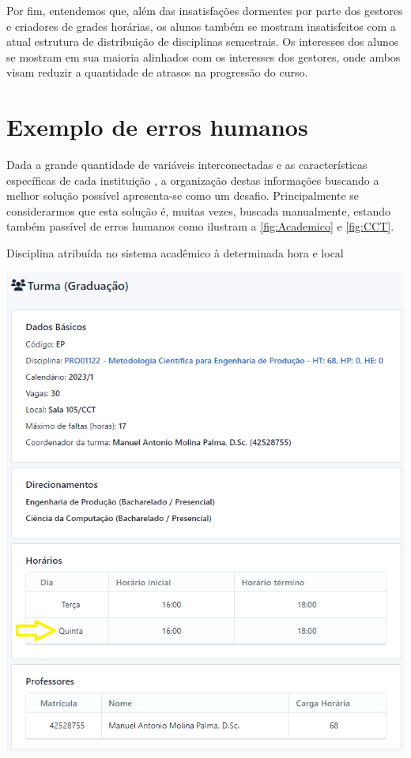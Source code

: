 Por fim, entendemos que, além das insatisfações dormentes por parte dos gestores e criadores de grades horárias, os alunos também se mostram insatisfeitos com a atual estrutura de distribuição de disciplinas semestrais. Os interesses dos alunos se mostram em sua maioria alinhados com os interesses dos gestores, onde ambos visam reduzir a quantidade de atrasos na progressão do curso.

\section{Exemplo de erros humanos} %

Dada a grande quantidade de variáveis interconectadas e as características específicas de cada instituição \cite{miranda_udpskeduler_2012}, a organização destas informações buscando a melhor solução possível apresenta-se como um desafio. Principalmente se considerarmos que esta solução é, muitas vezes, buscada manualmente, estando também passível de erros humanos como ilustram a \autoref{fig:Academico} e \autoref{fig:CCT}.

\begin{MyCenteredFigure}
  \caption{Disciplina atribuída no sistema acadêmico à determinada hora e local}
  \label{fig:Academico}
  \includegraphics[width=\textwidth]{files/img/2.02!3-organizacao/2.02!3.1.5-erros/Metodologia-Quinta}
\end{MyCenteredFigure}    %

